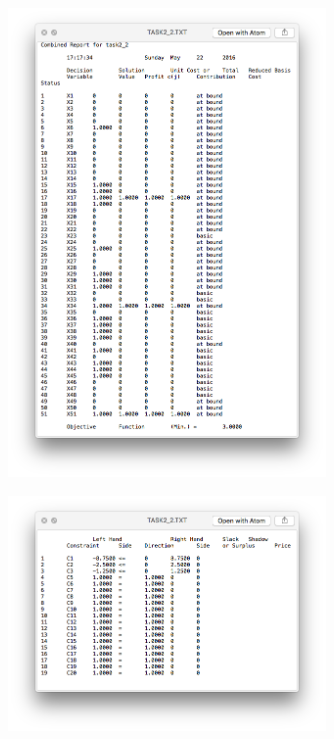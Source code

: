 \documentclass[10pt, a4paper]{article}
\begin{document}
			\paragraph{}
			\begin{figure}[H]
	        \centering
	            \includegraphics[width=0.75\textwidth]{res/exercise-2-result-a.png}
	        \end{figure}

			\begin{figure}[H]
	        \centering
	            \includegraphics[width=0.75\textwidth]{res/exercise-2-result-b.png}
	        \end{figure}
\end{document}
